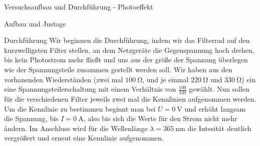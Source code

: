 \documentclass[pdftex, a4paper,11pt, twoside, ngerman]{report}
\begin{document}
\begin{chapter}{Versuchsaufbau und Durchführung - Photoeffekt}
\begin{section}{Aufbau und Justage}
\begin{section}{Durchführung}
       Wir beginnen die Durchführung, indem wir das Filterrad auf den kurzwelligsten Filter stellen, an dem Netzgeräte die Gegenspannung hoch drehen, bis kein Photostrom mehr fließt und uns aus der größe der Spannung überlegen wie der Spannungsteile zusammen gestellt werden soll. Wir haben aus den vorhanenden Wiederständen (zwei mal $\SI{100}{\ohm}$, und je einmal $\SI{220}{\ohm}$ und $\SI{330}{\ohm}$) ein eine Spannungsteilerschaltung mit einem Verhältnis von $\frac{100}{330}$ gewählt. Nun sollen für die verschiedenen Filter jeweils zwei mal die Kennlinien aufgenommen werden.
       Um die Kennlinie zu bestimmen beginnt man bei $U=\SI{0}{\volt}$ und erhöht langsam die Spannung, bis $I=\SI{0}{\ampere}$, also bis sich die Werte für den Strom nicht mehr ändern. Im Anschluss wird für die Wellenlänge $\lambda = \SI{365}{\nano\meter}$ die Intesität deutlich vergrößert und erneut eine Kennlinie aufgenommen.
       
      \end{section}
      
      
    \end{section}
    
  \end{chapter}
  
  
  
\end{document}
